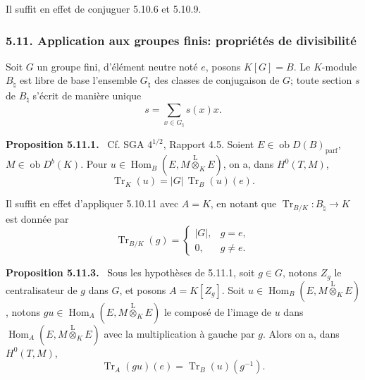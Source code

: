 \documentclass[11pt]{article}
\newenvironment{statement}[1]{\par\medskip\noindent\textbf{#1.}\ }{\par\medskip}
\DeclareMathOperator{\Hom}{Hom}
\newcommand{\ob}{\operatorname{ob}}
\providecommand{\Tr}{\operatorname{Tr}}
\providecommand{\Tr}{\operatorname{Tr}}
\providecommand{\lten}{\overset{\mathrm L}{\otimes}}
\providecommand{\Tr}{\operatorname{Tr}}
\providecommand{\Hom}{\operatorname{Hom}}
\providecommand{\ob}{\operatorname{ob}}
\providecommand{\lten}{\overset{\mathrm L}{\otimes}}
\providecommand{\lten}{\overset{\mathrm L}{\otimes}}
\providecommand{\Tr}{\operatorname{Tr}}
\providecommand{\lten}{\overset{\mathrm L}{\otimes}}
\providecommand{\lten}{\overset{\mathrm L}{\otimes}}
\providecommand{\lten}{\overset{\mathrm L}{\otimes}}
\providecommand{\Hom}{\operatorname{Hom}}
\providecommand{\Tr}{\operatorname{Tr}}
\providecommand{\lten}{\overset{\mathrm L}{\otimes}}
\begin{document}
Il suffit en effet de conjuguer 5.10.6 et 5.10.9.

\subsubsection*{5.11. Application aux groupes finis: propriétés de divisibilité}

Soit $G$ un groupe fini, d'élément neutre noté $e$, posons $K[G]=B$. Le $K$-module $B_\natural$ est libre de base l'ensemble $G_\natural$ des classes de conjugaison de $G$; toute section $s$ de $B_\natural$ s'écrit de manière unique
\[
s=\sum_{x\in G_\natural}s(x)x.
\]

\begin{statement}{Proposition 5.11.1}
Cf. SGA $4^{1/2}$, Rapport 4.5. Soient $E\in\ob D(B)_{\mathrm{parf}}$, $M\in\ob D^b(K)$. Pour $u\in\Hom_B(E,M\lten_KE)$, on a, dans $H^0(T,M)$,
\begin{equation}\tag{5.11.1}
\Tr_K(u)=|G|\,\Tr_B(u)(e).
\end{equation}
\end{statement}

Il suffit en effet d'appliquer 5.10.11 avec $A=K$, en notant que $\Tr_{B/K}:B_\natural\to K$ est donnée par
\begin{equation}\tag{5.11.2}
\Tr_{B/K}(g)=
\begin{cases}
|G|,& g=e,\\
0,& g\ne e.
\end{cases}
\end{equation}

\begin{statement}{Proposition 5.11.3}
Sous les hypothèses de 5.11.1, soit $g\in G$, notons $Z_g$ le centralisateur de $g$ dans $G$, et posons $A=K[Z_g]$. Soit $u\in\Hom_B(E,M\lten_KE)$, notons $gu\in\Hom_A(E,M\lten_KE)$ le composé de l'image de $u$ dans $\Hom_A(E,M\lten_KE)$ avec la multiplication à gauche par $g$. Alors on a, dans $H^0(T,M)$,
\begin{equation}\tag{5.11.4}
\Tr_A(gu)(e)=\Tr_B(u)(g^{-1}).
\end{equation}
\end{statement}
\end{document}
